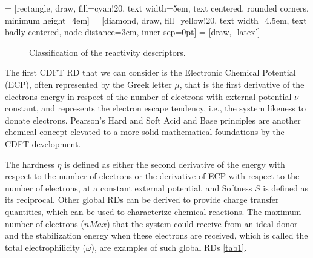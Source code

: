 \documentclass[a4paper,11pt]{refart}
\begin{document}
 = [rectangle, draw, fill=cyan!20, 
text width=5em, text centered, rounded corners, minimum height=4em]
 = [diamond, draw, fill=yellow!20, 
text width=4.5em, text badly centered, node distance=3cm, inner sep=0pt]
 = [draw, -latex']

\begin{figure}[H]
	\centering
{}
\caption{Classification of the reactivity descriptors.} \label{fig:M1}
\end{figure}


The first CDFT RD that we can consider is the Electronic Chemical Potential (ECP), often represented by the Greek letter $\mu$, that is the first derivative of the electrons energy in respect of the number of electrons with external potential $\nu$ constant, and represents the electron escape tendency, i.e., the system likeness to donate electrons.
Pearson's Hard and Soft Acid and Base principles are another chemical concept elevated to a more solid mathematical foundations by the CDFT development\cite{pearson1987recent}. 

The hardness $\eta$ is defined as either the second derivative of the energy with respect to the number of electrons or the derivative of ECP with respect to the number of electrons, at a constant external potential, and Softness $S$ is defined as its reciprocal. Other global RDs can be derived to provide charge transfer quantities, which can be used to characterize chemical reactions. The maximum number of electrons ($nMax$) that the system could receive from an ideal donor and the stabilization energy when these electrons are received, which is called the total electrophilicity ($\omega$), are examples of such global RDs \autoref{tab1}.
\end{document}

